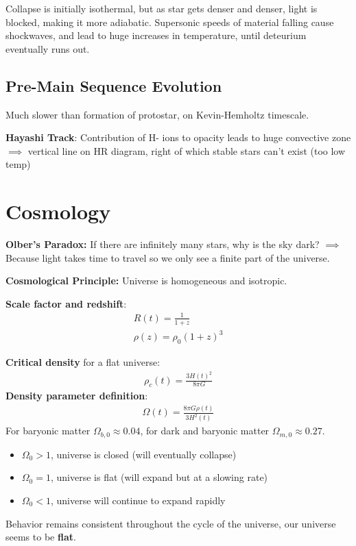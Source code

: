 \documentclass[12pt]{article}
\begin{document}
Collapse is initially isothermal, but as star gets denser and denser, light is blocked, making it more adiabatic. Supersonic speeds of material falling cause shockwaves, and lead to huge increases in temperature, until deteurium eventually runs out.

\subsection{Pre-Main Sequence Evolution}
Much slower than formation of protostar, on Kevin-Hemholtz timescale.

\textbf{Hayashi Track}:
Contribution of H- ions to opacity leads to huge convective zone $\implies$ vertical line on HR diagram, right of which stable stars can't exist (too low temp)

\section{Cosmology}
\textbf{Olber's Paradox:} If there are infinitely many stars, why is the sky dark? $\implies$ Because light takes time to travel so we only see a finite part of the universe.

\textbf{Cosmological Principle:} Universe is homogeneous and isotropic.

\textbf{Scale factor and redshift}:
\begin{align*}
    R(t) = \frac{1}{1 + z} \\
    \rho(z) = \rho_0(1 + z)^3
\end{align*}

\textbf{Critical density} for a flat universe:
\begin{align*}
    \rho_c(t) = \frac{3H(t)^2}{8\pi G}
\end{align*}
\textbf{Density parameter definition}:
\begin{align*}
    \Omega(t) = \frac{8\pi G\rho(t)}{3H^2(t)}
\end{align*}
For baryonic matter $\Omega_{b, 0} \approx 0.04$, for dark and baryonic matter $\Omega_{m, 0} \approx 0.27$.

\begin{itemize}
    \item $\Omega_0 > 1$, universe is closed (will eventually collapse)
    \item $\Omega_0 = 1$, universe is flat (will expand but at a slowing rate)
    \item $\Omega_0 < 1$, universe will continue to expand rapidly
\end{itemize}
Behavior remains consistent throughout the cycle of the universe, our universe seems to be \textbf{flat}.
\end{document}
